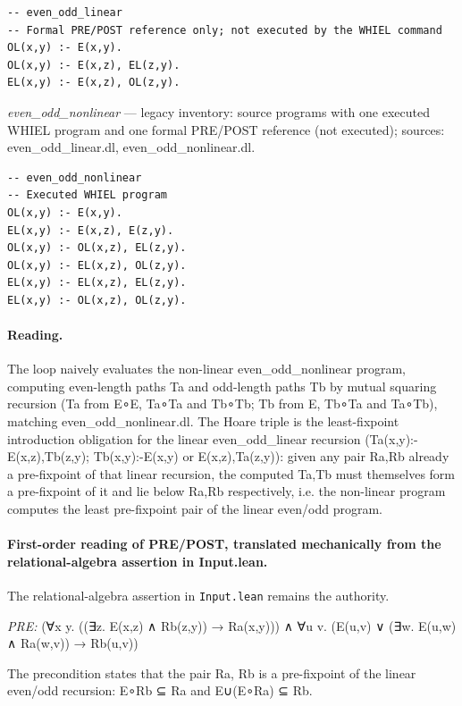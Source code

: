 \documentclass[10pt]{article}
\begin{document}
\begin{Verbatim}[fontsize=\scriptsize,breaklines=true,breakanywhere=true,frame=single,framesep=1.5mm]
-- even_odd_linear
-- Formal PRE/POST reference only; not executed by the WHIEL command
OL(x,y) :- E(x,y).
OL(x,y) :- E(x,z), EL(z,y).
EL(x,y) :- E(x,z), OL(z,y).
\end{Verbatim}

{\raggedright\textit{even\_odd\_nonlinear} --- legacy inventory: source programs with one executed WHIEL program and one formal PRE/POST reference (not executed); sources: even\_odd\_linear.dl, even\_odd\_nonlinear.dl.\par}

\begin{Verbatim}[fontsize=\scriptsize,breaklines=true,breakanywhere=true,frame=single,framesep=1.5mm]
-- even_odd_nonlinear
-- Executed WHIEL program
OL(x,y) :- E(x,y).
EL(x,y) :- E(x,z), E(z,y).
OL(x,y) :- OL(x,z), EL(z,y).
OL(x,y) :- EL(x,z), OL(z,y).
EL(x,y) :- EL(x,z), EL(z,y).
EL(x,y) :- OL(x,z), OL(z,y).
\end{Verbatim}

\paragraph{Reading.} The loop naively evaluates the non-linear even\_odd\_nonlinear program, computing even-length paths Ta and odd-length paths Tb by mutual squaring recursion (Ta from E∘E, Ta∘Ta and Tb∘Tb; Tb from E, Tb∘Ta and Ta∘Tb), matching even\_odd\_nonlinear.dl. The Hoare triple is the least-fixpoint introduction obligation for the linear even\_odd\_linear recursion (Ta(x,y):-E(x,z),Tb(z,y); Tb(x,y):-E(x,y) or E(x,z),Ta(z,y)): given any pair Ra,Rb already a pre-fixpoint of that linear recursion, the computed Ta,Tb must themselves form a pre-fixpoint of it and lie below Ra,Rb respectively, i.e. the non-linear program computes the least pre-fixpoint pair of the linear even/odd program.

\paragraph{First-order reading of PRE/POST, translated mechanically from the relational-algebra assertion in Input.lean.} The relational-algebra assertion in \texttt{Input.lean} remains the authority.

\textit{PRE:} (∀x y. ((∃z. E(x,z) ∧ Rb(z,y)) → Ra(x,y))) ∧ ∀u v. (E(u,v) ∨ (∃w. E(u,w) ∧ Ra(w,v)) → Rb(u,v))\par The precondition states that the pair Ra, Rb is a pre-fixpoint of the linear even/odd recursion: E∘Rb ⊆ Ra and E∪(E∘Ra) ⊆ Rb.
\end{document}
